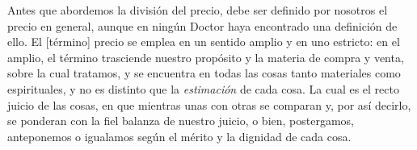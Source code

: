 \documentclass{article}
\begin{document}
\begin{paracol}{3}
\begin{nthcolumn}{1}
  \end{nthcolumn}
  \vspace{0.5cm}
  \begin{nthcolumn}{2} %
    Antes que abordemos la división del precio, debe ser definido por nosotros el precio en general, aunque en ningún Doctor haya encontrado una definición de ello. El [término] precio se emplea en un sentido amplio y en uno estricto: en el amplio, el término trasciende nuestro propósito y la materia de compra y venta, sobre la cual tratamos, y se encuentra en todas las cosas tanto materiales como espirituales, y no es distinto que la \emph{estimación} de cada cosa. La cual es el recto juicio de las cosas, en que mientras unas con otras se comparan y, por así decirlo, se ponderan con la fiel balanza de nuestro juicio, o bien, postergamos, anteponemos o igualamos según el mérito y la dignidad de cada cosa.
  \end{nthcolumn}
\end{paracol}
\end{document}
